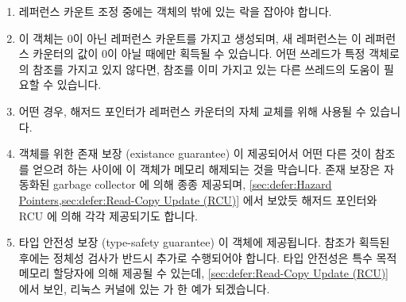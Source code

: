 \begin{enumerate}
\item	레퍼런스 카운트 조정 중에는 객체의 밖에 있는 락을 잡아야 합니다.
\item	이 객체는 0이 아닌 레퍼런스 카운트를 가지고 생성되며, 새 레퍼런스는 이
	레퍼런스 카운터의 값이 0이 아닐 때에만 획득될 수 있습니다.
	어떤 쓰레드가 특정 객체로의 참조를 가지고 있지 않다면, 참조를 이미
	가지고 있는 다른 쓰레드의 도움이 필요할 수 있습니다.
\item	어떤 경우, 해저드 포인터가 레퍼런스 카운터의 자체 교체를 위해 사용될 수
	있습니다.
\item	객체를 위한 존재 보장 (existance guarantee) 이 제공되어서 어떤 다른
	것이 참조를 얻으려 하는 사이에 이 객체가 메모리 해제되는 것을 막습니다.
	존재 보장은 자동화된 garbage collector 에 의해 종종 제공되며,
	\cref{sec:defer:Hazard Pointers,sec:defer:Read-Copy Update (RCU)}
	에서 보았듯 해저드 포인터와 RCU 에 의해 각각 제공되기도 합니다.
\item	타입 안전성 보장 (type-safety guarantee) 이 객체에 제공됩니다.
	참조가 획득된 후에는 정체성 검사가 반드시 추가로 수행되어야 합니다.
	타입 안전성은 특수 목적 메모리 할당자에 의해 제공될 수 있는데,
	\cref{sec:defer:Read-Copy Update (RCU)} 에서 보인, 리눅스 커널에 있는
	 가 한 예가 되겠습니다.

\iffalse

\item	A lock residing outside of the object must be held while
	manipulating the reference count.
\item	The object is created with a non-zero reference count, and new
	references may be acquired only when the current value of
	the reference counter is non-zero.
	If a thread does not have a reference to a given object, it
	might seek help from another thread that already has a reference.
\item	In some cases, hazard pointers may be used as a drop-in
	replacement for reference counters.
\item	An existence guarantee is provided for the object, thus preventing
	it from being freed while some other entity might be attempting
	to acquire a reference.
	Existence guarantees are often provided by automatic
	garbage collectors, and, as is seen in
	\cref{sec:defer:Hazard Pointers,sec:defer:Read-Copy Update (RCU)},
	by hazard pointers and RCU, respectively.
\item	A type-safety guarantee is provided for the object.
	An additional identity check must be performed once
	the reference is acquired.
	Type-safety guarantees can be provided by special-purpose
	memory allocators, for example, by the
	\co{SLAB_TYPESAFE_BY_RCU} feature within the Linux kernel,
	as is seen in \cref{sec:defer:Read-Copy Update (RCU)}.

\fi

\end{enumerate}

